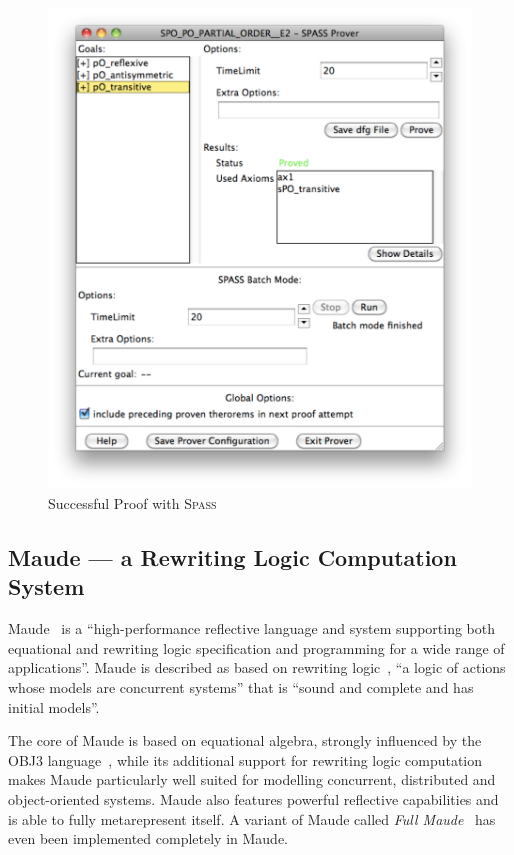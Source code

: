 \documentclass[11pt]{article}
\newcommand{\Spass}{\textsc{Spass}}
\begin{document}
\begin{figure}
\begin{minipage}[b]{0.5\textwidth}
    \includegraphics[width=\textwidth]{SPO_spass.pdf}
    \caption{Successful Proof with \Spass{}}\label{fig:casl-spo-spass}
  \end{minipage}
\end{figure}


\subsection{Maude --- a Rewriting Logic Computation System}
\label{sub:introduction_maude}

Maude~\cite{Clavel:2003} is a ``high-performance reflective language and system supporting both equational and rewriting logic specification and programming for a wide range of applications''. Maude is described as based on rewriting logic~\cite{Meseguer:1992}, ``a logic of actions whose models are concurrent systems'' that is ``sound and complete and has initial models''.

The core of Maude is based on equational algebra, strongly influenced by the OBJ3 language~\cite{Goguen:1993,Clavel:2002}, while its additional support for rewriting logic computation makes Maude particularly well suited for modelling concurrent, distributed and object-oriented systems. Maude also features powerful reflective capabilities and is able to fully metarepresent itself. A variant of Maude called \emph{Full Maude}~\cite{Duran:1999} has even been implemented completely in Maude.
\end{document}
